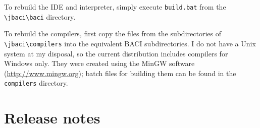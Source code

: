 \documentclass[11pt]{article}
\newcommand{\baci}{\textsc{\sffamily BACI}}
\newcommand{\p}[1]{\texttt{#1}}
\begin{document}
To rebuild the IDE and interpreter, simply execute \p{build.bat}
from the \verb=\=\p{jbaci}\verb=\=\p{baci} directory.

To rebuild the compilers, first copy the
files from the subdirectories of \verb=\=\p{jbaci}\verb=\=\p{compilers}
into the equivalent \baci{} subdirectories.
I do not have a Unix system at my disposal,
so the current distribution includes compilers for Windows only.
They were created using the MinGW software (\url{http://www.mingw.org});
batch files for building them can be found in the \p{compilers} directory.

\newpage

\section{Release notes}
\end{document}
